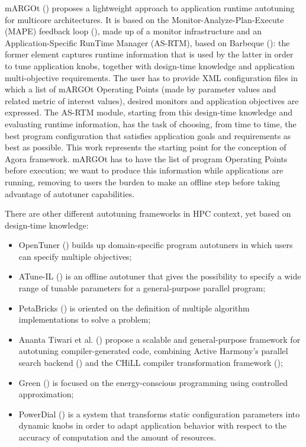 mARGOt (\cite{gadioli2015application}) proposes a lightweight approach to application runtime autotuning for multicore architectures. It is based on the Monitor-Analyze-Plan-Execute (MAPE) feedback loop (\cite{kephart2003vision}), made up of a monitor infrastructure and an Application-Specific RunTime Manager (AS-RTM), based on Barbeque \hbox{(\cite{bellasi2012rtrm})}: the former element captures runtime information that is used by the latter in order to tune application knobs, together with design-time knowledge and application multi-objective requirements. The user has to provide XML configuration files in which a list of mARGOt Operating Points (made by parameter values and related metric of interest values), desired monitors and application objectives are expressed. The AS-RTM module, starting from this design-time knowledge and evaluating runtime information, has the task of choosing, from time to time, the best program configuration that satisfies application goals and requirements as best as possible. This work represents the starting point for the conception of Agora framework. mARGOt has to have the list of program Operating Points before execution; we want to produce this information while applications are running, removing to users the burden to make an offline step before taking advantage of autotuner capabilities.

There are other different autotuning frameworks in HPC context, yet based on design-time knowledge: 

\begin{itemize}

	\item OpenTuner (\cite{ansel2014opentuner}) builds up domain-specific program autotuners in which users can specify multiple objectives;
	
	\item ATune-IL (\cite{schaefer2009atune}) is an offline autotuner that gives the possibility to specify a wide range of tunable parameters for a general-purpose parallel program;

	\item PetaBricks (\cite{ansel2009petabricks}) is oriented on the definition of multiple algorithm implementations to solve a problem;

	\item Ananta Tiwari et al. (\cite{tiwari2009scalable}) propose a scalable and general-purpose framework for autotuning compiler-generated code, combining Active Harmony's parallel search backend (\cite{chung2004using}) and the CHiLL compiler transformation framework (\cite{chen2008chill});

	\item Green (\cite{baek2010green}) is focused on the energy-conscious programming using controlled approximation;

	\item PowerDial (\cite{hoffmann2011dynamic}) is a system that transforms static configuration parameters into dynamic knobs in order to adapt application behavior with respect to the accuracy of computation and the amount of resources.

\end{itemize}

